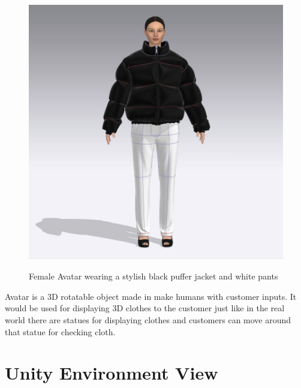 \begin{figure}[H]
    \centering
    \includegraphics[width=13cm,height=12cm]{Figures/3DAvatars/female2.jpeg}
    \caption{Female Avatar wearing a stylish black puffer jacket and white pants}
    \label{fig2:Stylish designed 3D jacket for females.In this image, you can see the female avatar wearing the jacket. This is the front view.}
\end{figure}
\justifying
	Avatar is a 3D rotatable object made in make humans with customer inputs. It would be used for displaying 3D clothes to the customer just like in the real world there are statues for displaying clothes and customers can move around that statue for checking cloth.  
\section{Unity Environment View}
